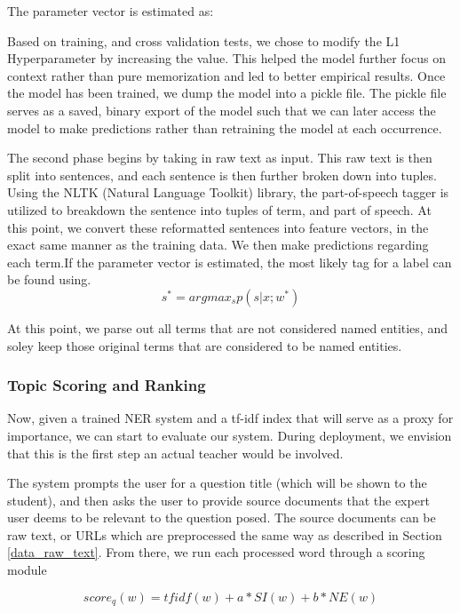 \documentclass[11pt,a4paper]{article}
\begin{document}
The parameter vector is estimated as:

Based on training, and cross validation tests, we chose to modify the L1 Hyperparameter by increasing the value. This helped the model further focus on context rather than pure memorization and led to better empirical results. Once the model has been trained, we dump the model into a pickle file. The pickle file serves as a saved, binary export of the model such that we can later access the model to make predictions rather than retraining the model at each occurrence. 

The second phase begins by taking in raw text as input. This raw text is then split into sentences, and each sentence is then further broken down into tuples. Using the NLTK (Natural Language Toolkit) library, the part-of-speech tagger is utilized to breakdown the sentence into tuples of term, and part of speech. At this point, we convert these reformatted sentences into feature vectors, in the exact same manner as the training data. We then make predictions regarding each term.If the parameter vector is estimated, the most likely tag for a label can be found using.
$$s^* = argmax_{s}p(s|x;w^*)$$

At this point, we parse out all terms that are not considered named entities, and soley keep those original terms that are considered to be named entities. 
\subsubsection{Topic Scoring and Ranking}

Now, given a trained NER system and a tf-idf index that will serve as a proxy for importance, we can start to evaluate our system. During deployment, we envision that this is the first step an actual teacher would be involved. 

The system prompts the user for a question title (which will be shown to the student), and then asks the user to provide source documents that the expert user deems to be relevant to the question posed. The source documents can be raw text, or URLs which are preprocessed the same way as described in Section  \ref{data_raw_text}. From there, we run each processed word through a scoring module

$$score_q(w) = tfidf(w) + a*SI(w) + b*NE(w)$$
\end{document}
